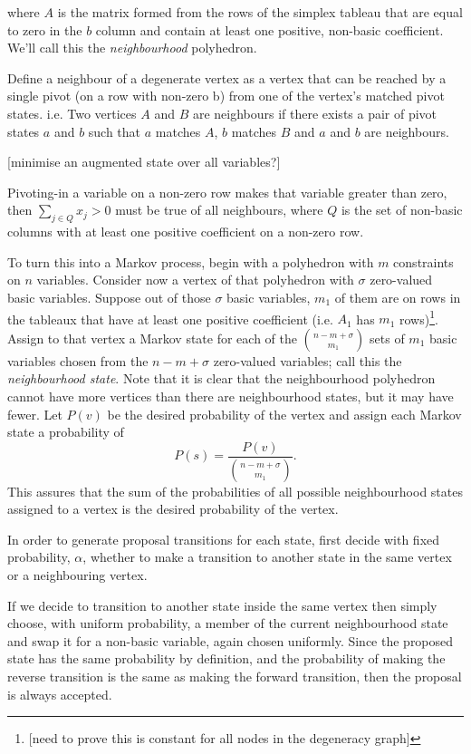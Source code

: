 \documentclass{article}
\begin{document}
where $A$ is the matrix formed from the rows of the simplex tableau that are equal to zero in the $b$ column and contain at least one positive, non-basic coefficient. We'll call this the \textit{neighbourhood} polyhedron.

Define a neighbour of a degenerate vertex as a vertex that can be reached by a single pivot (on a row with non-zero b) from one of the vertex's matched pivot states. i.e. Two vertices $A$ and $B$ are neighbours if there exists a pair of pivot states $a$ and $b$ such that $a$ matches $A$, $b$ matches $B$ and $a$ and $b$ are neighbours.

[minimise an augmented state over all variables?]

Pivoting-in a variable on a non-zero row makes that variable greater than zero, then $\sum_{j\in Q} x_j > 0$ must be true of all neighbours, where $Q$ is the set of non-basic columns with at least one positive coefficient on a non-zero row.

To turn this into a Markov process, begin with a polyhedron with $m$ constraints on $n$ variables. Consider now a vertex of that polyhedron with $\sigma$ zero-valued basic variables. Suppose out of those $\sigma$ basic variables, $m_1$ of them are on rows in the tableaux that have at least one positive coefficient (i.e. $A_1$ has $m_1$ rows)\footnote{[need to prove this is constant for all nodes in the degeneracy graph]}. Assign to that vertex a Markov state for each of the $n-m+\sigma \choose m_1$ sets of $m_1$ basic variables chosen from the $n-m+\sigma$ zero-valued variables; call this the \textit{neighbourhood state}. Note that it is clear that the neighbourhood polyhedron cannot have more vertices than there are neighbourhood states, but it may have fewer. Let $P(v)$ be the desired probability of the vertex and assign each Markov state a probability of
\[
P(s) = \frac{P(v)}{\left. n-m+\sigma \choose m_1 \right.}.
\]
This assures that the sum of the probabilities of all possible neighbourhood states assigned to a vertex is the desired probability of the vertex.

In order to generate proposal transitions for each state, first decide with fixed probability, $\alpha$, whether to make a transition to another state in the same vertex or a neighbouring vertex.

If we decide to transition to another state inside the same vertex then simply choose, with uniform probability, a member of the current neighbourhood state and swap it for a non-basic variable, again chosen uniformly. Since the proposed state has the same probability by definition, and the probability of making the reverse transition is the same as making the forward transition, then the proposal is always accepted.
\end{document}
